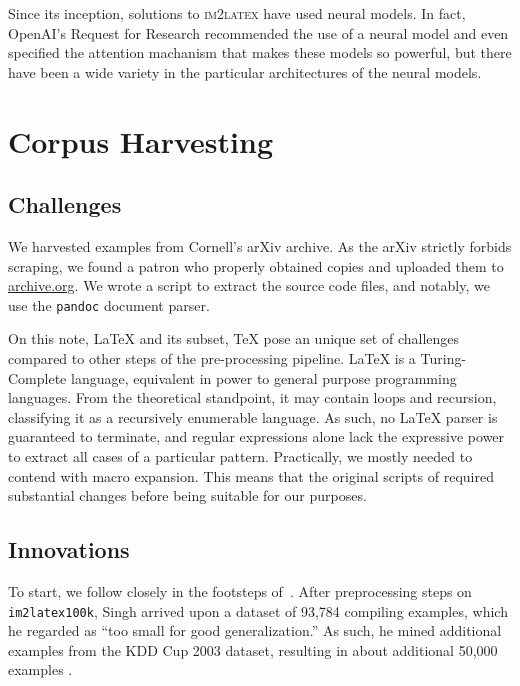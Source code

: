\documentclass{article}
\begin{document}
Since its inception, solutions to \textsc{im2latex} have used neural models. In
fact, OpenAI's Request for Research recommended the use of a neural model and
even specified the attention machanism that makes these models so powerful, but
there have been a wide variety in the particular architectures of the neural models.

\cite{deng2016you}
\cite{genthial2016image}
\cite{wang2019translating}
\cite{bender2019learning}

\section{Corpus Harvesting}


\subsection{Challenges}

We harvested examples from Cornell's arXiv archive. As the arXiv strictly
forbids scraping, we found a patron who properly obtained copies and uploaded
them to \url{archive.org}. We wrote a script to extract the source code files,
and notably, we use the \texttt{pandoc} document parser.

On this note, \LaTeX{} and its subset, \TeX{} pose an unique set of challenges
compared to other steps of the pre-processing pipeline. \LaTeX{} is a
Turing-Complete language, equivalent in power to general purpose programming
languages. From the theoretical standpoint, it may contain loops and recursion,
classifying it as a recursively enumerable language. As such, no \LaTeX{} parser
is guaranteed to terminate, and regular expressions alone lack the expressive
power to extract all cases of a particular pattern. Practically, we mostly
needed to contend with macro expansion. This means that the original scripts of
\cite{deng2016you} required substantial changes before being suitable for our
purposes.

\subsection{Innovations}
\label{datainnov}

To start, we follow closely in the footsteps of~\cite{singh2018teaching}. After
preprocessing steps on \texttt{im2latex100k}, Singh arrived upon a dataset of
93,784 compiling examples, which he regarded as ``too small for good
generalization.'' As such, he mined additional examples from the KDD Cup 2003
dataset, resulting in about additional 50,000 examples
\parencite[8]{singh2018teaching}.  %
\end{document}
